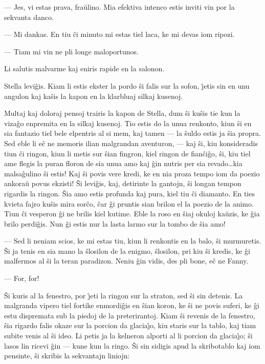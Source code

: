  --- Jes, vi estas prava, fra\u ulino. Mia efektiva intenco estis inviti
vin por la sekvanta danco.

 --- Mi dankas. En tiu \^ci minuto mi estas tiel laca, ke mi devas iom
ripozi.

 --- Tiam mi vin ne pli longe maloportunos.

   Li salutis malvarme kaj eniris rapide en la salonon.

   Stella levi\^gis. Kiam li estis ekster la pordo \^si falis sur la
sofon, \^{\j}etis sin en unu angulon kaj ka\^sis la kapon en la
klarbluaj silkaj kusenoj.

   Multaj kaj doloraj pensoj trairis la kapon de Stella, dum \^si ku\^sis
tie kun la viza\^go enpremita en la silkaj kusenoj. Tio estis do la
unua renkonto, kiun \^si en sia fantazio tiel bele elpentris al si
mem, kaj tamen --- la \^suldo estis ja \^sia propra. Sed eble li
e\^c ne memoris ilian malgrandan aventuron, --- kaj \^si, kiu
konsideradis tiun \^ci ringon, kiun li metis sur \^sian fingron,
kiel ringon de fian\^ci\^go, \^si, kiu tiel ame flegis la puran
floron de sia unua amo kaj \^gin nutris per sia revado\dots kia
malsa\^gulino \^si estis! Kaj \^si povis vere kredi, ke en nia proza
tempo iom da poezio ankora\u u povus ekzisti! \^Si levi\^gis, kaj,
detirinte la gantojn, \^si longan tempon rigardis la ringon. \^Sia
amo estis profunda kaj pura, kiel tiu \^ci diamanto. En ties kvieta
fajro ku\^sis mira sor\^co, \^car \^gi pruntis sian brilon el la
poezio de la animo. Tiun \^ci vesperon \^gi ne brilis kiel kutime.
Eble la roso en \^siaj okuloj ka\u uzis, ke \^gia brilo perdi\^gis.
Nun \^gi estis nur la lasta larmo sur la tombo de \^sia amo!

 --- Sed li neniam scios, ke mi estas tiu, kiun li renkontis en la
balo, \^si murmuretis. \^Si ja tenis en sia mano la \^slosilon de la
enigmo, \^slosilon, pri kiu \^si kredis, ke \^gi malfermos al \^si
la teran paradizon. Neniu \^gin vidis, des pli bone, e\^c ne Fanny.

 --- For, for!

   \^Si kuris al la fenestro, por \^{\j}eti la ringon sur la straton, sed
\^si sin detenis. La malgranda vipero tiel fortike enmordi\^gis en
\^sian koron, ke \^si ne povis suferi, ke \^gi estu dispremata sub
la piedoj de la preterirantoj. Kiam \^si revenis de la fenestro,
\^sia rigardo falis okaze sur la porcion da glacia\^{\j}o, kiu
staris sur la tablo, kaj tiam subite venis al \^si ideo. Li petis ja
la kelneron alporti al li porcion da glacia\^{\j}o; \^si lasos lin
ricevi \^gin --- kune kun la ringo. \^Si sin sidigis apud la
skribotablo kaj iom pensinte, \^si skribis la sekvantajn liniojn:


